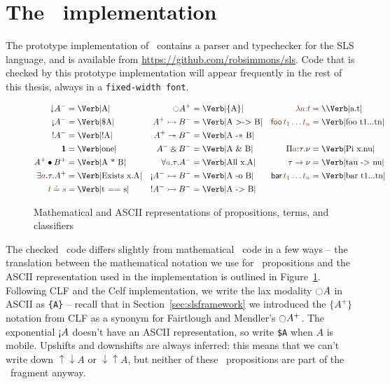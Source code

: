 \section{The \sls~implementation}
\label{sec:prototype}

The prototype implementation of \sls~contains a parser and typechecker
for the SLS language, and is available from
\url{https://github.com/robsimmons/sls}. Code that is checked by this
prototype implementation will appear frequently in the rest of this
thesis, always in a \verb|fixed-width font|.

\begin{figure}
\newcommand{\thingamajig}{=}
\begin{align*}
{\downarrow}A^- & \thingamajig \mbox{\Verb|A|} 
 & {\ocircle}A^+ & \thingamajig \mbox{\Verb|\{A\}|}
 & \lf{\lambda a.t} & \thingamajig \mbox{{\texttt{\char`\\}}\Verb|a.t|}
\\
{\gnab}A^- & \thingamajig \mbox{\Verb|\$A|}
 & A^+ \lefti B^- & \thingamajig \mbox{\Verb|A >-> B|}
 & \lf{{\sf foo}\,t_1\ldots t_n} & \thingamajig \mbox{\Verb|foo t1...tn|}
\\
{!}A^- & \thingamajig \mbox{\Verb|!A|}
 & A^+ \righti B^- & \thingamajig \mbox{\Verb|A ->> B|}
\\
\one & \thingamajig \mbox{\Verb|one|}
 & A^- \with B^- & \thingamajig \mbox{\Verb|A \& B|}
 & \Pi\lf{a}{:}\tau.\nu & \thingamajig \mbox{\Verb|Pi x.nu|}
\\
A^+ \fuse B^+ & \thingamajig \mbox{\Verb|A * B|}
 & \forall \lf{a}.\tau. A^- & \thingamajig \mbox{\Verb|All x.A|}
 & \tau \rightarrow \nu & \thingamajig{\mbox{\Verb|tau -> nu|}}
\\
\exists \lf{a}.\tau. A^+ & \thingamajig \mbox{\Verb|Exists x.A|}
 & {\gnab}A^- \lefti B^- & \thingamajig \mbox{\Verb|A -o B|}
 & {\sf bar}\,\lf{t_1 \ldots t_n} & \thingamajig{\mbox{\Verb|bar t1...tn|}}
\\
\lf{t} \doteq \lf{s} & \thingamajig \mbox{\Verb|t == s|}
 & {!}A^- \lefti B^- & \thingamajig \mbox{\Verb|A -> B|}
\end{align*}
\caption{Mathematical and ASCII representations of propositions,
  terms, and classifiers}
\label{fig:translate-types}
\end{figure}


The checked \sls~code differs slightly from mathematical \sls~code in
a few ways -- the
translation between the mathematical notation we use for
\sls~propositions and the ASCII representation used in the
implementation is outlined in Figure~\ref{fig:translate-types}.
Following CLF and the Celf implementation, we write the
lax modality ${\ocircle}A$ in ASCII as \verb|{A}| -- recall that in
Section~\ref{sec:slsframework} we introduced the $\{ A^+ \}$ notation
from CLF as a synonym for Fairtlough and Mendler's ${\ocircle}A^+$.
The exponential ${\gnab}A$ doesn't have an ASCII
representation, so write \verb|$A| when $A$ is mobile. Upshifts and
downshifts are always inferred: this means that we can't write down
${\uparrow}{\downarrow}A$ or ${\downarrow}{\uparrow}A$, but neither of
these \ollll~propositions are part of the \sls~fragment anyway. 

